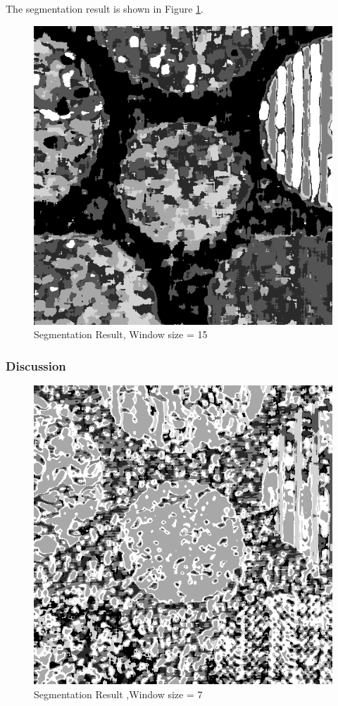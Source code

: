 \documentclass[11pt]{article}
\begin{document}
The segmentation result is shown in Figure \ref{texture_seg}.
\begin{figure}[!htp]
	\centering
	\includegraphics[scale=0.4]{texture_seg_15.png}
	\caption{Segmentation Result, Window size = 15}
	\label{texture_seg}
	\end{figure}
\subsubsection{Discussion}

\begin{figure}[!htp]
	\centering
	\includegraphics[scale=0.4]{texture_seg_7.png}
	\caption{Segmentation Result ,Window size = 7}
	\label{texture_seg_7}
	\end{figure}
	
\end{document}
